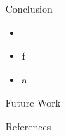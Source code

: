 \documentclass[final]{beamer}
\newlength{\sepwid}
\newlength{\onecolwid}
\newlength{\twocolwid}
\begin{document}
\begin{frame}[t]
\begin{columns}[t]
\begin{column}{\twocolwid}
\end{column} %

\begin{column}{\sepwid}\end{column} %

\begin{column}{\onecolwid} %


\begin{block}{Conclusion}
{\small
\begin{itemize}
\item 
\item f
\item a
\end{itemize}

}
\end{block}




\begin{block}{Future Work}
{\small
 
}
\end{block}


\begin{block}{References}
{\small

}
\end{block}






\end{column}
\end{columns}
\end{frame}
\end{document}
